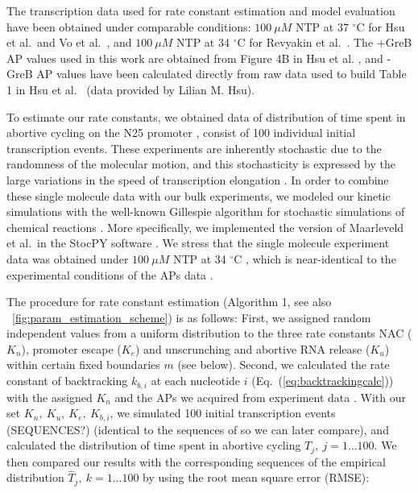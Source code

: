 The transcription data used for rate constant estimation and model evaluation
have been obtained under comparable conditions: $100\ \mu M$ NTP at 37
$^{\circ}$C for Hsu et al.\ and Vo et al.\
\cite{hsu_initial_2006,vo_vitro_2003-1}, and $100\ \mu M$ NTP at 34
$^{\circ}$C for Revyakin et al.\ \cite{revyakin_abortive_2006}. The +GreB AP
values used in this work are obtained from Figure 4B in Hsu et al.
\cite{hsu_initial_2006}, and -GreB AP values have been calculated directly
from raw data used to build Table 1 in Hsu et al.\ \cite{hsu_initial_2006}
(data provided by Lilian M. Hsu).



To estimate our rate constants, we obtained data of distribution of time spent
in abortive cycling on the N25 promoter \cite{revyakin_abortive_2006}, consist
of 100 individual initial transcription events. These experiments are
inherently stochastic due to the randomness of the molecular motion, and this
stochasticity is expressed by the large variations in the speed of
transcription elongation \cite{adelman_single_2002,
tolic-norrelykke_diversity_2004} . In order to combine these single molecule
data with our bulk experiments, we modeled our kinetic simulations with the
well-known Gillespie algorithm for stochastic simulations of chemical
reactions \cite{gillespie_exact_1977}. More specifically, we implemented the
version of Maarleveld et al.\ in the StocPY software
\cite{maarleveld_stochpy:_2013}. We stress that the single molecule experiment
data was obtained under $100\ \mu M$ NTP at 34 $^{\circ}$C
\cite{revyakin_abortive_2006}, which is near-identical to the experimental
conditions of the APs data  \cite{hsu_initial_2006}.

The procedure for rate constant estimation (Algorithm 1, see also
\FIG~\ref{fig:param_estimation_scheme}) is as follows: First, we assigned
random independent values from a uniform distribution to the three rate
constants NAC ($K_n$), promoter escape ($K_e$) and unscrunching and abortive
RNA release ($K_u$) within certain fixed boundaries $m$ (see below). Second,
we calculated the rate constant of backtracking $k_{b,i}$ at each nucleotide
$i$ (Eq.~(\ref{eq:backtrackingcalc})) with the assigned $K_n$ and the APs we
acquired from experiment data \cite{hsu_initial_2006}. With our set ${K_n,\
K_u,\ K_e,\ K_{b,i}}$, we  simulated 100 initial transcription events
(SEQUENCES?) (identical to the sequences of \cite{revyakin_abortive_2006} so
we can later compare), and calculated the distribution of time spent in
abortive cycling $T_j,\ j=1...100$. We then compared our results with the
corresponding sequences of the empirical distribution $\hat T_j,\ k=1...100$
\cite{revyakin_abortive_2006} by using the root mean square error (RMSE):

